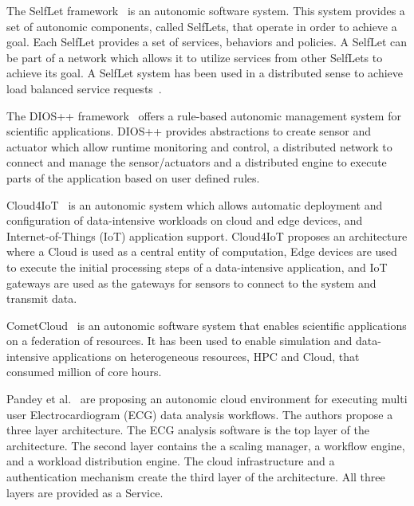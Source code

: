 The SelfLet framework~\cite{bindelli2008building} is an autonomic software system. 
This system provides a set of autonomic components, called SelfLets, that operate 
in order to achieve a goal. Each SelfLet provides a set of services, behaviors 
and policies. A SelfLet can be part of a network which allows it to utilize 
services from other SelfLets to achieve its goal. A SelfLet system has been used 
in a distributed sense to achieve load balanced service requests~\cite{calcavecchia2010emergence}.

The DIOS++ framework~\cite{liu2003dios} offers a rule-based autonomic management 
system for scientific applications. DIOS++ provides abstractions to create sensor 
and actuator which allow runtime monitoring and control, a distributed network to 
connect and manage the sensor/actuators and a distributed engine to execute parts 
of the application based on user defined rules.

Cloud4IoT~\cite{pizzolli2016cloud4iot} is an autonomic system which allows automatic 
deployment and configuration of data-intensive workloads on cloud and edge devices, 
and Internet-of-Things (IoT) application support. Cloud4IoT proposes an architecture 
where a Cloud is used as a central entity of computation, Edge devices are used to 
execute the initial processing steps of a data-intensive application, and IoT 
gateways are used as the gateways for sensors to connect to the system and 
transmit data.

CometCloud~\cite{diazmontes2015cometcloud} is an autonomic software system that 
enables scientific applications on a federation of resources. It has been used 
to enable simulation and data-intensive applications on heterogeneous resources, 
HPC and Cloud, that consumed million of core hours.

Pandey et al.~\cite{pandey2012autonomic} are proposing an autonomic cloud 
environment for executing multi user Electrocardiogram (ECG) data analysis 
workflows. The authors propose a three layer architecture. The ECG analysis 
software is the top layer of the architecture. The second layer contains the a 
scaling manager, a workflow engine, and a workload distribution engine. The cloud 
infrastructure and a authentication mechanism create the third layer of the 
architecture. All three layers are provided as a Service.